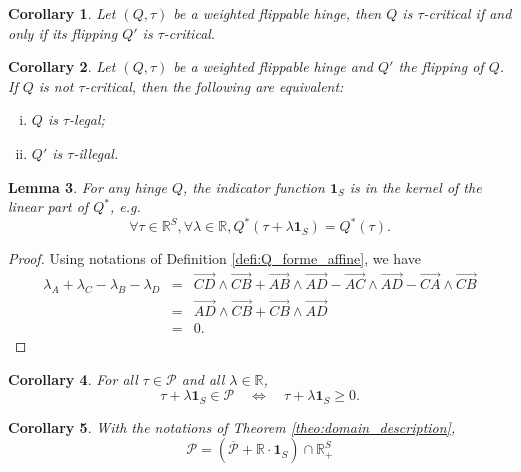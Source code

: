 \documentclass[a4paper,12pt]{article}
\def\adm{\P}
\def\RR{\mathbb{R}}
\def\adm{\mathcal{P}}
\def\P{\mathcal{P}}
\newtheorem{lem}{Lemma}[section]		 %
\newtheorem{cor}[lem]{Corollary}
\theoremstyle{definition}
\begin{document}
						\begin{cor}\label{cor:weighted_flippable_hinge_critical}
						 Let $(Q,\tau)$ be a weighted flippable hinge,
						 then $Q$ is $\tau$-critical if and only if its flipping $Q'$ is $\tau$-critical.
						\end{cor}

						\begin{cor} \label{cor:inversion_Qconvexe} Let $(Q,\tau)$ be a weighted flippable hinge and $Q'$ the flipping of $Q$.						
						If $Q$ is not $\tau$-critical, then the following are equivalent:
						\begin{enumerate}[(i)]
						 \item $Q$ is $\tau$-legal;
						 \item $Q'$ is $\tau$-illegal.
						\end{enumerate}
						\end{cor}


						\begin{lem}\label{lem:kernel_hinge} For any hinge $Q$, 
						 the indicator function $\mathbf{1}_S$ is in the kernel of the linear part of $Q^*$, e.g.\ 
						 $$\forall \tau\in \RR^S,\forall \lambda\in \RR, Q^*(\tau+\lambda\mathbf{1}_S)=Q^*(\tau).$$
						\end{lem}
						\begin{proof}
						 Using notations of Definition \ref{defi:Q_forme_affine}, we have
						 \begin{eqnarray*}
						 \lambda_A+\lambda_C-\lambda_B-\lambda_D &=& \overrightarrow{CD}\wedge \overrightarrow{CB} +\overrightarrow{AB}\wedge\overrightarrow{AD} - \overrightarrow{AC}\wedge \overrightarrow{AD}- \overrightarrow{CA}\wedge \overrightarrow{CB} \\
						 &=& \overrightarrow{AD}\wedge \overrightarrow{CB}+ \overrightarrow{CB}\wedge\overrightarrow{AD} \\
						 &=&0.
						 \end{eqnarray*}\end{proof}

						\begin{cor}\label{cor:translation}
							For all $\tau \in \adm$ and all $\lambda \in \RR$, 
							$$\tau+\lambda \mathbf{1}_S\in \adm \quad \Leftrightarrow \quad \tau+\lambda \mathbf{1}_S\geq 0.$$
						\end{cor}
						\begin{cor}\label{cor:theo3_b}
						With the notations of Theorem \ref{theo:domain_description},
							$$\adm = (\overline{\adm} + \RR\cdot\mathbf{1}_S)\cap \RR_+^S$$
						\end{cor}
\end{document}
